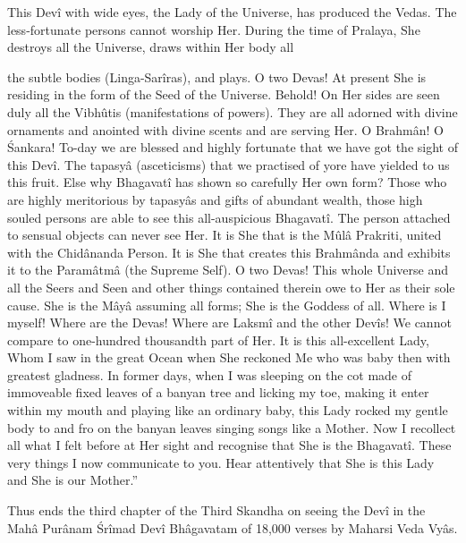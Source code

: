 This Dev\^i with wide eyes, the Lady of the Universe, has produced the Vedas. The less-fortunate persons cannot worship Her. During the time of Pralaya, She destroys all the Universe, draws within Her body all

the subtle bodies (Linga-Sar\^iras), and plays. O two Devas! At present She is residing in the form of the Seed of the Universe. Behold! On Her sides are seen duly all the Vibhûtis (manifestations of powers). They are all adorned with divine ornaments and anointed with divine scents and are serving Her. O Brahm\^an! O \'Sankara! To-day we are blessed and highly fortunate that we have got the sight of this Dev\^i. The tapasy\^a (asceticisms) that we practised of yore have yielded to us this fruit. Else why Bhagavat\^i has shown so carefully Her own form? Those who are highly meritorious by tapasy\^as and gifts of abundant wealth, those high souled persons are able to see this all-auspicious Bhagavat\^i. The person attached to sensual objects can never see Her. It is She that is the Mûl\^a Prakriti, united with the Chid\^ananda Person. It is She that creates this Brahm\^anda and exhibits it to the Param\^atm\^a (the Supreme Self). O two Devas! This whole Universe and all the Seers and Seen and other things contained therein owe to Her as their sole cause. She is the M\^ay\^a assuming all forms; She is the Goddess of all. Where is I myself! Where are the Devas! Where are Laksm\^i and the other Dev\^is! We cannot compare to one-hundred thousandth part of Her. It is this all-excellent Lady, Whom I saw in the great Ocean when She reckoned Me who was baby then with greatest gladness. In former days, when I was sleeping on the cot made of immoveable fixed leaves of a banyan tree and licking my toe, making it enter within my mouth and playing like an ordinary baby, this Lady rocked my gentle body to and fro on the banyan leaves singing songs like a Mother. Now I recollect all what I felt before at Her sight and recognise that She is the Bhagavat\^i. These very things I now communicate to you. Hear attentively that She is this Lady and She is our Mother.''

Thus ends the third chapter of the Third Skandha on seeing the Dev\^i in the Mah\^a Pur\^anam \'Sr\^imad Dev\^i Bh\^agavatam of 18,000 verses by Maharsi Veda Vy\^as.